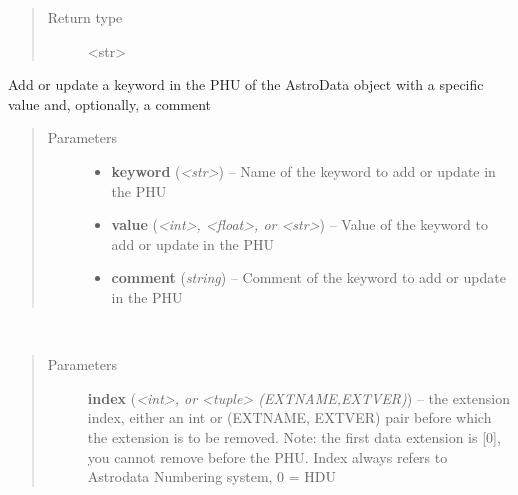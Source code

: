 \documentclass[letterpaper,10pt,english]{sphinxmanual}
\begin{document}
\begin{fulllineitems}
\begin{fulllineitems}
\begin{quote}
\begin{description}
\item[{Return type}] \leavevmode
\textless{}str\textgreater{}

\end{description}\end{quote}

\end{fulllineitems}


\begin{fulllineitems}
\label{astro_class:astrodata.AstroData.AstroData.phu_set_key_value}
Add or update a keyword in the PHU of the AstroData object with a
specific value and, optionally, a comment
\begin{quote}\begin{description}
\item[{Parameters}] \leavevmode\begin{itemize}
\item {} 
\textbf{keyword} (\emph{\textless{}str\textgreater{}}) -- Name of the keyword to add or update in the PHU

\item {} 
\textbf{value} (\emph{\textless{}int\textgreater{}, \textless{}float\textgreater{}, or \textless{}str\textgreater{}}) -- Value of the keyword to add or update in the PHU

\item {} 
\textbf{comment} (\emph{string}) -- Comment of the keyword to add or update in the PHU

\end{itemize}

\end{description}\end{quote}

\end{fulllineitems}


\begin{fulllineitems}
\label{astro_class:astrodata.AstroData.AstroData.remove}~\begin{quote}\begin{description}
\item[{Parameters}] \leavevmode
\textbf{index} (\emph{\textless{}int\textgreater{}, or \textless{}tuple\textgreater{} (EXTNAME,EXTVER)}) -- the extension index, either an int or (EXTNAME, EXTVER)
pair before which the extension is to be removed.
Note: the first data extension is {[}0{]}, you cannot remove 
before the PHU. Index always refers to Astrodata Numbering 
system, 0 = HDU


\end{description}
\end{quote}
\end{fulllineitems}
\end{fulllineitems}
\end{document}

